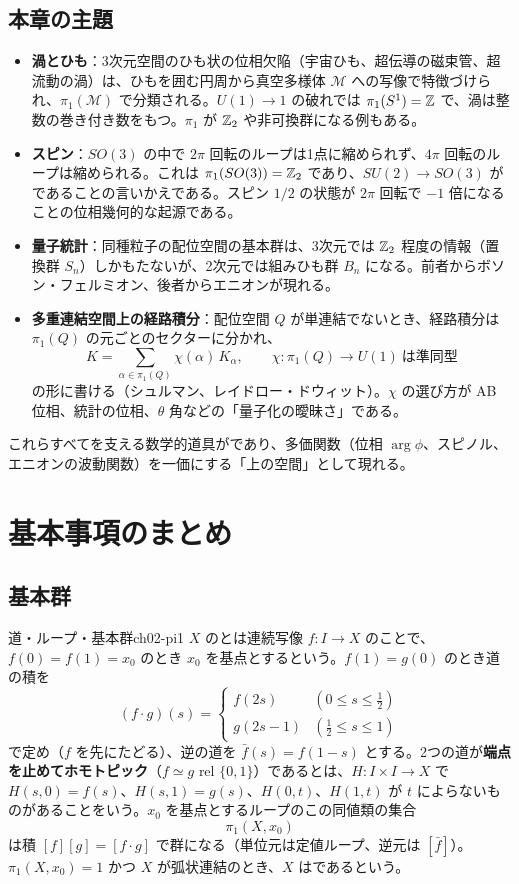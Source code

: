 \subsection*{本章の主題}
\begin{itemize}
\item \textbf{渦とひも}：3次元空間のひも状の位相欠陥（宇宙ひも、超伝導の磁束管、超流動の渦）は、ひもを囲む円周から真空多様体 $\mathcal M$ への写像で特徴づけられ、$\pi_1(\mathcal M)$ で分類される。$U(1)\to1$ の破れでは $\pi_1(S^1)=\mathbb{Z}$ で、渦は整数の巻き付き数をもつ。$\pi_1$ が $\mathbb{Z}_2$ や非可換群になる例もある。
\item \textbf{スピン}：$SO(3)$ の中で $2\pi$ 回転のループは1点に縮められず、$4\pi$ 回転のループは縮められる。これは $\pi_1(SO(3))=\mathbb{Z}_2$ であり、$SU(2)\to SO(3)$ がであることの言いかえである。スピン $1/2$ の状態が $2\pi$ 回転で $-1$ 倍になることの位相幾何的な起源である。
\item \textbf{量子統計}：同種粒子の配位空間の基本群は、3次元では $\mathbb{Z}_2$ 程度の情報（置換群 $S_n$）しかもたないが、2次元では組みひも群 $B_n$ になる。前者からボソン・フェルミオン、後者からエニオンが現れる。
\item \textbf{多重連結空間上の経路積分}：配位空間 $Q$ が単連結でないとき、経路積分は $\pi_1(Q)$ の元ごとのセクターに分かれ、
\[
K=\sum_{\alpha\in\pi_1(Q)}\chi(\alpha)\,K_\alpha,\qquad \chi\colon\pi_1(Q)\to U(1)\ \text{は準同型}
\]
の形に書ける（シュルマン、レイドロー・ドウィット）。$\chi$ の選び方が AB 位相、統計の位相、$\theta$ 角などの「量子化の曖昧さ」である。
\end{itemize}
これらすべてを支える数学的道具がであり、多価関数（位相 $\arg\phi$、スピノル、エニオンの波動関数）を一価にする「上の空間」として現れる。

\section{基本事項のまとめ}

\subsection{基本群}

\begin{mydef}{道・ループ・基本群}{ch02-pi1}
$X$ のとは連続写像 $f\colon I\to X$ のことで、$f(0)=f(1)=x_0$ のとき $x_0$ を基点とするという。$f(1)=g(0)$ のとき道の積を
\[
(f\cdot g)(s)=\begin{cases}f(2s)&(0\le s\le\tfrac12)\\ g(2s-1)&(\tfrac12\le s\le1)\end{cases}
\]
で定め（$f$ を先にたどる）、逆の道を $\bar f(s)=f(1-s)$ とする。2つの道が\textbf{端点を止めてホモトピック}（$f\simeq g$ rel $\{0,1\}$）であるとは、$H\colon I\times I\to X$ で $H(s,0)=f(s)$、$H(s,1)=g(s)$、$H(0,t)$、$H(1,t)$ が $t$ によらないものがあることをいう。$x_0$ を基点とするループのこの同値類の集合
\[
\pi_1(X,x_0)
\]
は積 $[f][g]=[f\cdot g]$ で群になる（単位元は定値ループ、逆元は $[\bar f]$）。$\pi_1(X,x_0)=1$ かつ $X$ が弧状連結のとき、$X$ はであるという。
\end{mydef}

